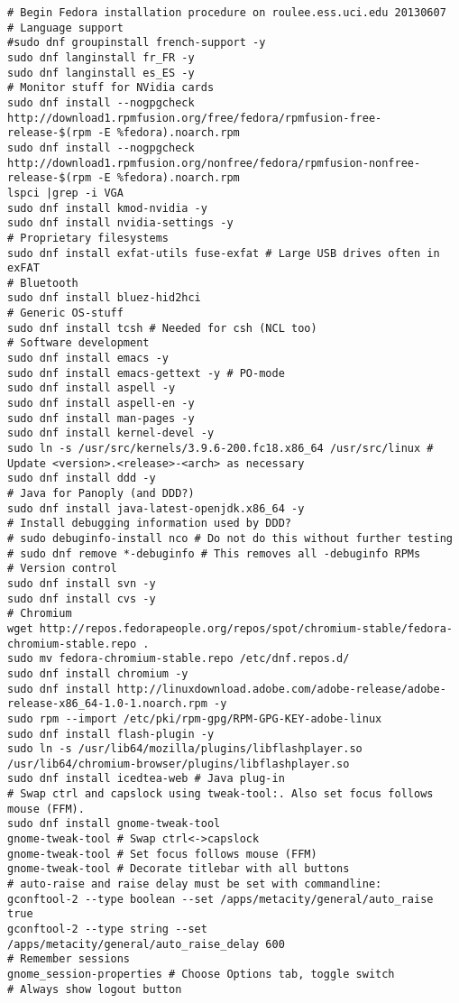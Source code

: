 \documentclass[12pt,twoside]{article}
\begin{document}
\begin{verbatim}
# Begin Fedora installation procedure on roulee.ess.uci.edu 20130607
# Language support
#sudo dnf groupinstall french-support -y
sudo dnf langinstall fr_FR -y
sudo dnf langinstall es_ES -y
# Monitor stuff for NVidia cards
sudo dnf install --nogpgcheck http://download1.rpmfusion.org/free/fedora/rpmfusion-free-release-$(rpm -E %fedora).noarch.rpm
sudo dnf install --nogpgcheck http://download1.rpmfusion.org/nonfree/fedora/rpmfusion-nonfree-release-$(rpm -E %fedora).noarch.rpm
lspci |grep -i VGA
sudo dnf install kmod-nvidia -y
sudo dnf install nvidia-settings -y
# Proprietary filesystems
sudo dnf install exfat-utils fuse-exfat # Large USB drives often in exFAT
# Bluetooth
sudo dnf install bluez-hid2hci
# Generic OS-stuff
sudo dnf install tcsh # Needed for csh (NCL too)
# Software development
sudo dnf install emacs -y
sudo dnf install emacs-gettext -y # PO-mode
sudo dnf install aspell -y
sudo dnf install aspell-en -y
sudo dnf install man-pages -y
sudo dnf install kernel-devel -y
sudo ln -s /usr/src/kernels/3.9.6-200.fc18.x86_64 /usr/src/linux # Update <version>.<release>-<arch> as necessary
sudo dnf install ddd -y
# Java for Panoply (and DDD?)
sudo dnf install java-latest-openjdk.x86_64 -y
# Install debugging information used by DDD?
# sudo debuginfo-install nco # Do not do this without further testing
# sudo dnf remove *-debuginfo # This removes all -debuginfo RPMs
# Version control
sudo dnf install svn -y
sudo dnf install cvs -y
# Chromium
wget http://repos.fedorapeople.org/repos/spot/chromium-stable/fedora-chromium-stable.repo .
sudo mv fedora-chromium-stable.repo /etc/dnf.repos.d/
sudo dnf install chromium -y
sudo dnf install http://linuxdownload.adobe.com/adobe-release/adobe-release-x86_64-1.0-1.noarch.rpm -y
sudo rpm --import /etc/pki/rpm-gpg/RPM-GPG-KEY-adobe-linux
sudo dnf install flash-plugin -y
sudo ln -s /usr/lib64/mozilla/plugins/libflashplayer.so /usr/lib64/chromium-browser/plugins/libflashplayer.so
sudo dnf install icedtea-web # Java plug-in
# Swap ctrl and capslock using tweak-tool:. Also set focus follows mouse (FFM).
sudo dnf install gnome-tweak-tool
gnome-tweak-tool # Swap ctrl<->capslock
gnome-tweak-tool # Set focus follows mouse (FFM)
gnome-tweak-tool # Decorate titlebar with all buttons
# auto-raise and raise delay must be set with commandline:
gconftool-2 --type boolean --set /apps/metacity/general/auto_raise true
gconftool-2 --type string --set /apps/metacity/general/auto_raise_delay 600
# Remember sessions
gnome_session-properties # Choose Options tab, toggle switch
# Always show logout button

\end{verbatim}
\end{document}
